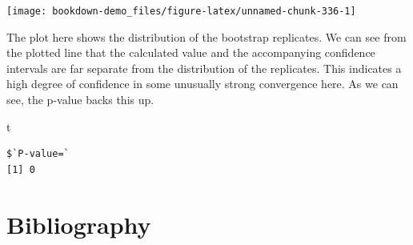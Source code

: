 \documentclass[
]{book}
\newenvironment{Shaded}{\begin{snugshade}}{\end{snugshade}}
\newcommand{\NormalTok}[1]{#1}
\begin{document}
\begin{center}\texttt{[image: bookdown-demo\_files/figure-latex/unnamed-chunk-336-1]} \end{center}

The plot here shows the distribution of the bootstrap replicates. We can see from the plotted line that the calculated value and the accompanying confidence intervals are far separate from the distribution of the replicates. This indicates a high degree of confidence in some unusually strong convergence here. As we can see, the p-value backs this up.

\begin{Shaded}
\begin{Highlighting}[]
\NormalTok{t}
\end{Highlighting}
\end{Shaded}

\begin{verbatim}
$`P-value=`
[1] 0
\end{verbatim}

\hypertarget{bibliography}{%
\chapter{Bibliography}\label{bibliography}}

  
\end{document}

